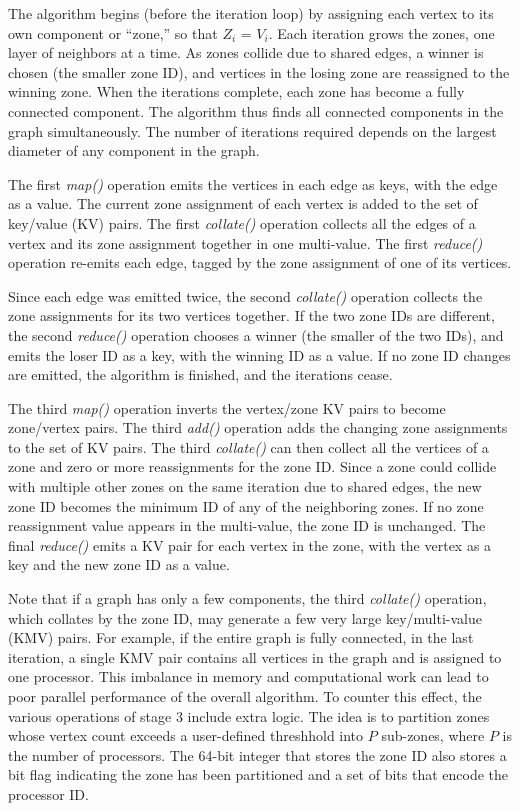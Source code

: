 The algorithm begins (before the iteration loop) by assigning each
vertex to its own component or ``zone,'' so that $Z_i$ = $V_i$.  Each
iteration grows the zones, one layer of neighbors at a time.  As
zones collide due to shared edges, a winner is chosen (the smaller
zone ID), and vertices in the losing zone are reassigned to the
winning zone.  When the iterations complete, each zone has
become a fully connected component.  The algorithm thus finds all
connected components in the graph simultaneously.  The number of
iterations required depends on the largest diameter of any component
in the graph.

The first {\it map()} operation emits the vertices in each edge as
keys, with the edge as a value.  The current zone assignment of each
vertex is added to the set of key/value (KV) pairs.  The first {\it
collate()} operation collects all the edges of a vertex and its zone
assignment together in one multi-value.  The first {\it reduce()}
operation re-emits each edge, tagged by the zone assignment of one of
its vertices.

Since each edge was emitted twice, the second {\it collate()}
operation collects the zone assignments for its two vertices together.
If the two zone IDs are different, the second {\it reduce()} operation
chooses a winner (the smaller of the two IDs), and emits the loser ID
as a key, with the winning ID as a value.  If no zone ID changes are
emitted, the algorithm is finished, and the iterations cease.

The third {\it map()} operation inverts the vertex/zone KV pairs to
become zone/vertex pairs.  The third {\it add()} operation adds the
changing zone assignments to the set of KV pairs.  The third {\it
collate()} can then collect all the vertices of a zone and zero or
more reassignments for the zone ID.  Since a zone could collide with
multiple other zones on the same iteration due to shared edges, the
new zone ID becomes the minimum ID of any of the neighboring zones.
If no zone reassignment value appears in the multi-value, the zone ID
is unchanged.  The final {\it reduce()} emits a KV pair for each
vertex in the zone, with the vertex as a key and the new zone ID as a
value.

Note that if a graph has only a few components, the third {\it
collate()} operation, which collates by the zone ID, may generate a
few very large key/multi-value (KMV) pairs.  For example, if the
entire graph is fully connected, in the last iteration, a single KMV
pair contains all vertices in the graph and is assigned to one
processor.  This imbalance in memory and computational work can lead
to poor parallel performance of the overall algorithm.  To counter
this effect, the various operations of stage 3 include extra logic.
The idea is to partition zones whose vertex count exceeds a
user-defined threshhold into $P$ sub-zones, where $P$ is the number of
processors.  The 64-bit integer that stores the zone ID also stores a
bit flag indicating the zone has been partitioned and a set of bits
that encode the processor ID.

